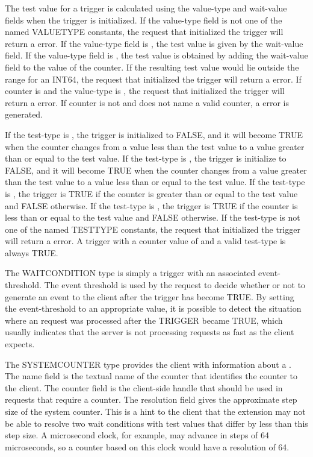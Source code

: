 The test value for a trigger is calculated using the value-type and
wait-value fields when the trigger is initialized. 
If the value-type field is not one of the 
named VALUETYPE constants, the request that initialized the trigger
will return a  error. If the
value-type field is , the test value is given by the
wait-value field. If the value-type field is
, the test value is obtained by adding the
wait-value field to the value of the counter.  If the
resulting test value would lie outside the range for an INT64, the
request that initialized the trigger will return a
 error. If counter is  and the
value-type is , the request that initialized the 
trigger will return a  error. 
If counter is not  and does not name a valid
counter, a  error is generated.

If the test-type is , the trigger is
initialized to FALSE, and it will become TRUE when the counter changes
from a value less than the test value to a value greater than or equal to the
test value. If the test-type is , the
trigger is initialize to FALSE, and it will become TRUE when the
counter changes from a value greater than the test value to a value
less than or equal to the test value. If the test-type is
, the trigger is TRUE if the counter is greater than or
equal to the test value and FALSE otherwise.  If the test-type is
, the trigger is TRUE if the counter is less than or
equal to the test value and FALSE otherwise. If the test-type
is not one of the named TESTTYPE constants, the request that
initialized the trigger will return a  error.  A trigger
with a counter value of  and a valid test-type
is always TRUE.

The WAITCONDITION type is simply a trigger with an associated
event-threshold.  The event threshold is used by the 
request to decide whether or not to generate an event to the client after the
trigger has become TRUE. By setting the event-threshold to an
appropriate value, it is possible to detect the situation where an
 request was processed after the TRIGGER became TRUE,
which usually indicates that the server is not processing requests as fast as
the client expects.

The SYSTEMCOUNTER type provides the client with information about a
. The name field is the textual name of the
counter that identifies the counter to the client. The counter field
is the client-side handle that should be used in requests that require a
counter. The resolution field gives the approximate step size of the
system counter. This is a hint to the client that the extension may not be
able to resolve two wait conditions with test values that differ by less than
this step size. A microsecond clock, for example, may advance in steps of 64
microseconds, so a counter based on this clock would have a resolution
of 64.

